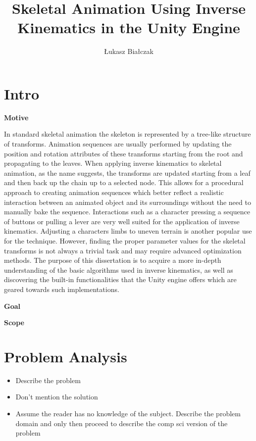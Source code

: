 \documentclass[a4paper, 12pt]{article} \linespread{1.3}
\title{Skeletal Animation Using Inverse Kinematics in the Unity Engine}
\author{Łukasz Białczak} \date{}
\begin{document}
\maketitle

\tableofcontents

\section{Intro}

\textbf{Motive}

In standard skeletal animation the skeleton is represented by a tree-like
structure of transforms. Animation sequences are usually performed by updating
the position and rotation attributes of these transforms starting from the root
and propagating to the leaves. When applying inverse kinematics to skeletal
animation, as the name suggests, the transforms are updated starting from a leaf
and then back up the chain up to a selected node. This allows for a procedural
approach to creating animation sequences which better reflect a realistic
interaction between an animated object and its surroundings without the need to
manually bake the sequence. Interactions such as a character pressing a sequence
of buttons or pulling a lever are very well suited for the application of inverse
kinematics. Adjusting a characters limbs to uneven terrain is another popular
use for the technique. However, finding the proper parameter values for the
skeletal transforms is not always a trivial task and may require advanced
optimization methods. The purpose of this dissertation is to acquire a more
in-depth understanding of the basic algorithms used in inverse kinematics, as
well as discovering the built-in functionalities that the Unity engine offers
which are geared towards such implementations.


\textbf{Goal}

\textbf{Scope}

\section{Problem Analysis}
\begin{itemize}
    \item Describe the problem
    \item Don't mention the solution
    \item Assume the reader has no knowledge of the subject. Describe the
        problem domain and only then proceed to describe the comp sci version of
        the problem
\end{itemize}
\end{document}
